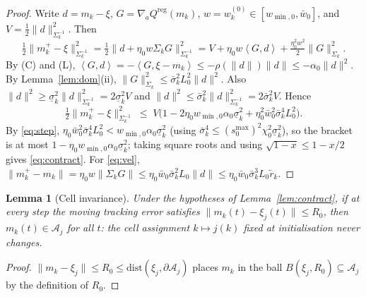 \documentclass[11pt]{article}
\newtheorem{lemma}{Lemma}
\theoremstyle{definition}
\newcommand{\cA}{\mathcal{A}}
\newcommand{\ip}[2]{\left\langle #1, #2 \right\rangle}
\begin{document}
\begin{proof}
Write $d = m_k - \xi$, $G = \nabla_a Q^{\mathrm{reg}}(m_k)$, $w = w^{(0)}_k \in
[w_{\min,0}, \bar w_0]$, and $V = \tfrac12\|d\|^2_{\Sigma_k^{-1}}$. Then
\[
  \tfrac12\|m^+_k - \xi\|^2_{\Sigma_k^{-1}}
  = \tfrac12\|d + \eta_0 w \Sigma_k G\|^2_{\Sigma_k^{-1}}
  = V + \eta_0 w \ip{G}{d} + \tfrac{\eta_0^2 w^2}{2}\|G\|^2_{\Sigma_k} .
\]
By (C) and (L), $\ip{G}{d} = -\ip{G}{\xi - m_k} \le -\rho(\|d\|)\|d\| \le
-\alpha_0\|d\|^2$. By Lemma~\ref{lem:dom}(ii), $\|G\|^2_{\Sigma_k} \le
\bar\sigma_k^2 L_0^2 \|d\|^2$. Also $\|d\|^2 \ge \underline\sigma_k^2
\|d\|^2_{\Sigma_k^{-1}} = 2\underline\sigma_k^2 V$ and $\|d\|^2 \le
\bar\sigma_k^2\|d\|^2_{\Sigma_k^{-1}} = 2\bar\sigma_k^2 V$. Hence
\[
  \tfrac12\|m^+_k - \xi\|^2_{\Sigma_k^{-1}}
  \;\le\; V\Big(1 - 2\eta_0 w_{\min,0}\alpha_0\underline\sigma_k^2
  + \eta_0^2 \bar w_0^2 \bar\sigma_k^4 L_0^2\Big).
\]
By \eqref{eq:step}, $\eta_0 \bar w_0^2\bar\sigma_k^4L_0^2 <
w_{\min,0}\alpha_0 \underline\sigma_k^2$ (using
$\bar\sigma_k^4 \le (s^{\max}_0)^2\chi_0^2\underline\sigma_k^2$), so the bracket is
at most $1 - \eta_0 w_{\min,0}\alpha_0\underline\sigma_k^2$; taking square roots
and using $\sqrt{1-x} \le 1 - x/2$ gives \eqref{eq:contract}. For
\eqref{eq:vel}, $\|m^+_k - m_k\| = \eta_0 w\|\Sigma_k G\| \le \eta_0\bar w_0
\bar\sigma_k^2 L_0\|d\| \le \eta_0\bar w_0\bar\sigma_k^3 L_0 \tilde r_k$.
\end{proof}

\begin{lemma}[Cell invariance]\label{lem:inv}
Under the hypotheses of Lemma~\ref{lem:contract}, if at every step the
\emph{moving} tracking error satisfies $\|m_k(t) - \xi_j(t)\| \le R_0$, then
$m_k(t) \in \cA_j$ for all $t$: the cell assignment $k \mapsto j(k)$ fixed at
initialisation never changes.
\end{lemma}

\begin{proof}
$\|m_k - \xi_j\| \le R_0 \le \mathrm{dist}(\xi_j, \partial\cA_j)$ places $m_k$ in
the ball $B(\xi_j, R_0) \subseteq \cA_j$ by the definition of $R_0$.
\end{proof}
\end{document}
